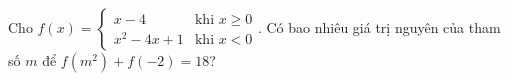 \begin{ex}
Cho $f(x)=\begin{cases}x-4 & \text{khi } x\ge0\\ x^2-4x+1 & \text{khi } x<0\end{cases}$. Có bao nhiêu giá trị nguyên của tham số $m$ để $f(m^2)+f(-2)=18$?
\end{ex}
